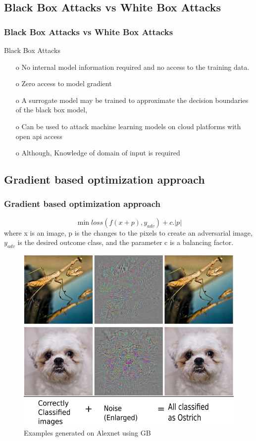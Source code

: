 \documentclass[12pt]{beamer}
\begin{document}
\subsection{Black Box Attacks vs White Box Attacks}
\begin{frame}
\frametitle{Black Box Attacks vs White Box Attacks}
Black Box Attacks
\begin{itemize}
	\item[o] No internal model information required and no access to the training data. \pause
	\item[o] Zero access to model gradient \pause
	\item[o] A surrogate model may be trained to approximate the decision boundaries of the black box model, \pause
	\item[o] Can be used to attack machine learning models on cloud platforms with open api access\protect\footnotemark \pause
	\item[o] Although, Knowledge of domain of input is required \pause
\end{itemize}

\end{frame}

\subsection{Gradient based optimization approach}
\begin{frame}
\frametitle{Gradient based optimization approach}
$$\min loss(f(x + p), y_{adv}) + c.|p|$$
{\small where x is an image, p is the changes to the pixels to create an adversarial image, $y_{adv}$ is the desired outcome class, and the parameter c is a balancing factor.}

\begin{figure}
	\centering
	\includegraphics[width=0.5\linewidth, height=0.44\textheight]{img/adv_ex}
	\caption[Examples generated on Alexnet]{Examples generated on Alexnet using GB\protect\footnotemark}
	\label{fig:advex}
\end{figure}

\end{frame}
\end{document}
